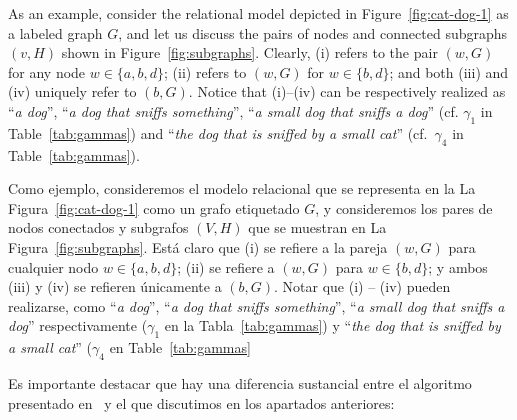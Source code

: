 As an example, consider the relational model depicted in
Figure~\ref{fig:cat-dog-1} as a labeled graph $G$, and let us
discuss the pairs of nodes and connected subgraphs $(v,H)$ shown in
Figure~\ref{fig:subgraphs}. Clearly, (i) refers to the pair $(w,G)$
for any node $w\in\{a,b,d\}$; (ii) refers to $(w,G)$ for
$w\in\{b,d\}$; and both (iii) and (iv) uniquely refer to $(b,G)$. Notice
that (i)--(iv) can be respectively realized as ``{\em a dog}'',
``{\em a dog that sniffs something}'', ``{\em a small dog that
sniffs a dog}'' (cf. $\gamma_1$ in Table~\ref{tab:gammas}) %
and ``{\em the dog that is sniffed by a small cat}'' (cf.~$\gamma_4$ in
Table~\ref{tab:gammas}).


Como ejemplo, consideremos el modelo relacional que se representa en la
La Figura~\ref{fig:cat-dog-1} como un grafo etiquetado $G$, y consideremos los pares de nodos conectados y subgrafos $(V, H)$ que se muestran en 
La Figura~\ref{fig:subgraphs}. Est\'a claro que (i) se refiere a la pareja $(w, G)$
para cualquier nodo $w\in\{a,b,d\}$; (ii) se refiere a $(w, G)$ para
$w\in\{b,d\}$; y ambos (iii) y (iv) se refieren \'unicamente a $(b, G)$. Notar
que (i) -- (iv) pueden realizarse, como  ``{\em a dog}'',
``{\em a dog that sniffs something}'', ``{\em a small dog that
sniffs a dog}'' respectivamente ($\gamma_1$ en la Tabla~\ref{tab:gammas}) y ``{\em the dog that is sniffed by a small cat}'' ($\gamma_4$ en
Table~\ref{tab:gammas}


Es importante destacar que hay una diferencia sustancial
entre el algoritmo presentado en~\cite{Krahmer2003} y el que discutimos
en los apartados anteriores:
%


